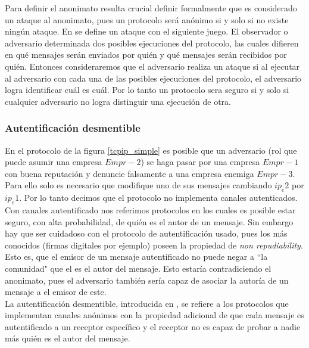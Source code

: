 Para definir el anonimato resulta crucial definir formalmente que es considerado
un ataque al anonimato, pues un protocolo será anónimo si y solo si no existe ningún ataque.
En \cite{conf/pet/HeviaM08} se define un ataque con el siguiente juego.
El observador o adversario determinada dos posibles ejecuciones del protocolo, las cuales difieren en
qué mensajes serán enviados por quién y qué mensajes serán recibidos por quién. Entonces
consideraremos que el adversario realiza un ataque si al ejecutar al adversario con cada una
de las posibles ejecuciones del protocolo, el adversario logra identificar cuál es cuál.
Por lo tanto un protocolo sera seguro si y solo si cualquier adversario no logra distinguir
una ejecución de otra.

\subsubsection{Autentificación desmentible}
En el protocolo de la figura \ref{tcpip_simple} es posible que un adversario (rol que puede
asumir una empresa $Empr-2$) se haga pasar por una empresa $Empr-1$ con buena reputación y denuncie
falsamente a una empresa enemiga $Empr-3$. Para ello
solo es necesario que modifique uno de sus mensajes cambiando $ip_e2$ por $ip_e1$.
Por lo tanto decimos que el protocolo no implementa canales autenticados.\\
Con canales autentificado nos referimos protocolos en los cuales es posible estar seguro,
con alta probabilidad, de quién es el autor de un mensaje. Sin embargo hay que ser cuidadoso
con el protocolo de autentificación usado, pues los más conocidos
(firmas digitales por ejemplo) poseen la propiedad de \textit{non repudiability}. Esto es,
que el emisor de un mensaje autentificado no puede negar a ``la comunidad" que el es el autor
del mensaje. Esto estaría contradiciendo el anonimato, pues el adversario también sería capaz
de asociar la autoría de un mensaje a el emisor de este.\\
La autentificación desmentible, introducida en \cite{DwoNaoSah04}, se refiere a los protocolos
que implementan canales anónimos con la propiedad adicional de que cada mensaje es autentificado
a un receptor específico y el receptor no es capaz de probar a nadie más quién es el autor del mensaje.

